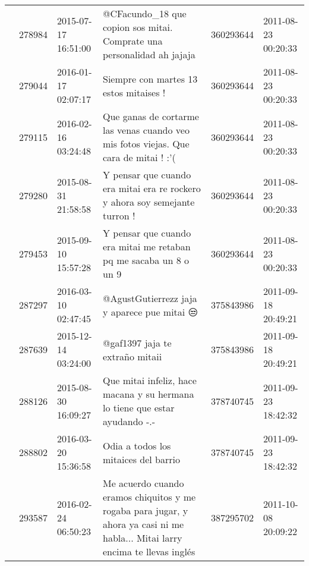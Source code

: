 \begin{tabular}{llllrl}
           & 278984  & 2015-07-17 16:51:00 &                                                                       @CFacundo\_18 que copion sos mitai. Comprate una personalidad ah jajaja &   360293644 & 2011-08-23 00:20:33 \\
           & 279044  & 2016-01-17 02:07:17 &                                                                                                       Siempre con martes 13 estos mitaises ! &   360293644 & 2011-08-23 00:20:33 \\
           & 279115  & 2016-02-16 03:24:48 &                                                         Que ganas de cortarme las venas cuando veo mis fotos viejas. Que cara de mitai ! :'( &   360293644 & 2011-08-23 00:20:33 \\
           & 279280  & 2015-08-31 21:58:58 &                                                                  Y pensar que cuando era mitai era re rockero y ahora soy semejante turron ! &   360293644 & 2011-08-23 00:20:33 \\
           & 279453  & 2015-09-10 15:57:28 &                                                                            Y pensar que cuando era mitai me retaban pq me sacaba un 8 o un 9 &   360293644 & 2011-08-23 00:20:33 \\
           & 287297  & 2016-03-10 02:47:45 &                                                                                                  @AgustGutierrezz jaja y aparece pue mitai 😒 &   375843986 & 2011-09-18 20:49:21 \\
           & 287639  & 2015-12-14 03:24:00 &                                                                                                              @gaf1397 jaja te extraño mitaii &   375843986 & 2011-09-18 20:49:21 \\
           & 288126  & 2015-08-30 16:09:27 &                                                                  Que mitai infeliz, hace macana y su hermana lo tiene que estar ayudando -.- &   378740745 & 2011-09-23 18:42:32 \\
           & 288802  & 2016-03-20 15:36:58 &                                                                                                         Odia a todos los mitaices del barrio &   378740745 & 2011-09-23 18:42:32 \\
           & 293587  & 2016-02-24 06:50:23 &                Me acuerdo cuando eramos chiquitos y me rogaba para jugar, y ahora ya casi ni me habla... Mitai larry encima te llevas inglés &   387295702 & 2011-10-08 20:09:22 \\

\end{tabular}
